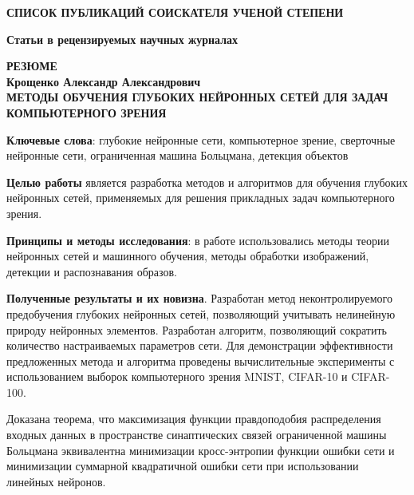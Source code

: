\documentclass{thesisby}
\begin{document}

\def\selectlanguageifdefined#1{
\expandafter\ifx\csname date#1\endcsname\relax
\else\language\csname l@#1\endcsname\fi}

\bigskip
\centerline{\bf СПИСОК ПУБЛИКАЦИЙ СОИСКАТЕЛЯ УЧЕНОЙ СТЕПЕНИ}

\vspace{1mm}
{\bf Статьи в рецензируемых научных журналах}
\vspace{2mm}

\begin{enumerate}[wide, labelindent=10mm]



\end{enumerate}

\newpage
\begin{center}
\bf РЕЗЮМЕ
\\[1mm]\rm Крощенко Александр Александрович\\[1mm] \bf
МЕТОДЫ ОБУЧЕНИЯ ГЛУБОКИХ НЕЙРОННЫХ СЕТЕЙ ДЛЯ ЗАДАЧ КОМПЬЮТЕРНОГО ЗРЕНИЯ
 \end{center}

{\bf Ключевые слова}: глубокие нейронные сети, компьютерное зрение, сверточные нейронные сети, ограниченная машина Больцмана, детекция объектов

\textbf{Целью работы} является разработка методов и алгоритмов для обучения глубоких нейронных сетей, применяемых для решения прикладных задач компьютерного зрения.

\textbf{Принципы и методы исследования}: в работе использовались методы теории нейронных сетей и машинного обучения, методы обработки изображений, детекции и распознавания образов.

\textbf{Полученные результаты и их новизна}.
Разработан метод неконтролируемого предобучения глубоких нейронных сетей, позволяющий учитывать нелинейную природу нейронных элементов. Разработан алгоритм, позволяющий сократить количество настраиваемых параметров сети. Для демонстрации эффективности предложенных метода и алгоритма проведены вычислительные эксперименты с использованием выборок компьютерного зрения MNIST, CIFAR-10 и CIFAR-100.

Доказана теорема, что максимизация функции правдоподобия распределения входных данных в пространстве синаптических связей ограниченной машины Больцмана эквивалентна минимизации кросс-энтропии функции ошибки сети и минимизации суммарной квадратичной ошибки сети при использовании линейных нейронов.
\end{document}
